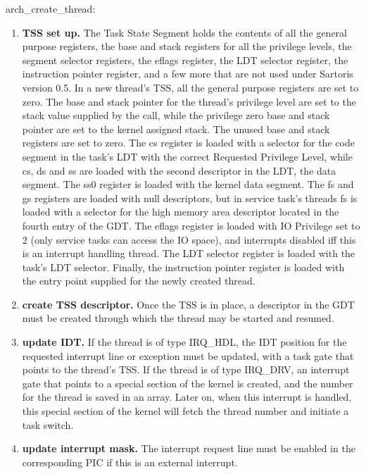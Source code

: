 \documentclass[11pt, letterpaper, twoside, english]{book}
\begin{document}
\textsf{arch\_create\_thread}: 
\begin{enumerate}
\item[]\textbf{TSS set up.} The Task State Segment holds the contents of all the general purpose registers, the base and stack registers for all the privilege levels, the segment selector registers, the eflags register, the LDT selector register, the instruction pointer register, and a few more that are not used under Sartoris version 0.5. In a new thread's TSS, all the general purpose registers are set to zero. The base and stack pointer for the thread's privilege level are set to the stack value supplied by the call, while the privilege zero base and stack pointer are set to the kernel assigned stack. The unused base and stack registers are set to zero. The cs register is loaded with a selector for the code segment in the task's LDT with the correct Requested Privilege Level, while cs, ds and ss are loaded with the second descriptor in the LDT, the data segment. The ss0 register is loaded with the kernel data segment. The fs and gs registers are loaded with null descriptors, but in service task's threads fs is loaded with a selector for the high memory area descriptor located in the fourth entry of the GDT. The eflags register is loaded with IO Privilege set to 2 (only service tasks can access the IO space), and interrupts disabled iff this is an interrupt handling thread. The LDT selector register is loaded with the task's LDT selector. Finally, the instruction pointer register is loaded with the entry point supplied for the newly created thread.
\item[]\textbf{create TSS descriptor.} Once the TSS is in place, a descriptor in the GDT must be created through which the thread may be started and resumed.
\item[]\textbf{update IDT.} If the thread is of type \textsf{IRQ\_HDL}, the IDT position for the requested interrupt line or exception must be updated, with a task gate that points to the thread's TSS. If the thread is of type \textsf{IRQ\_DRV}, an interrupt gate that points to a special section of the kernel is created, and the number for the thread is saved in an array. Later on, when this interrupt is handled, this special section of the kernel will fetch the thread number and initiate a task switch. 
\item[]\textbf{update interrupt mask.} The interrupt request line must be enabled in the corresponding PIC if this is an external interrupt.
\end{enumerate}
\end{document}
